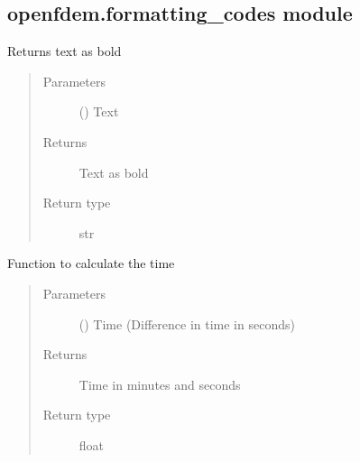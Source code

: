 \documentclass[letterpaper,10pt,english]{sphinxmanual}
\begin{document}
\subsection{openfdem.formatting\_codes module}
\label{\detokenize{openfdem:module-openfdem.formatting_codes}}\label{\detokenize{openfdem:openfdem-formatting-codes-module}}

\begin{fulllineitems}
\label{\detokenize{openfdem:openfdem.formatting_codes.bold_text}}
Returns text as bold
\begin{quote}\begin{description}
\item[{Parameters}] \leavevmode
{} () \textendash{} Text

\item[{Returns}] \leavevmode
Text as bold

\item[{Return type}] \leavevmode
str

\end{description}\end{quote}

\end{fulllineitems}


\begin{fulllineitems}
\label{\detokenize{openfdem:openfdem.formatting_codes.calc_timer_values}}
Function to calculate the time
\begin{quote}\begin{description}
\item[{Parameters}] \leavevmode
{} () \textendash{} Time (Difference in time in seconds)

\item[{Returns}] \leavevmode
Time in minutes and seconds

\item[{Return type}] \leavevmode
float

\end{description}\end{quote}

\end{fulllineitems}
\end{document}
